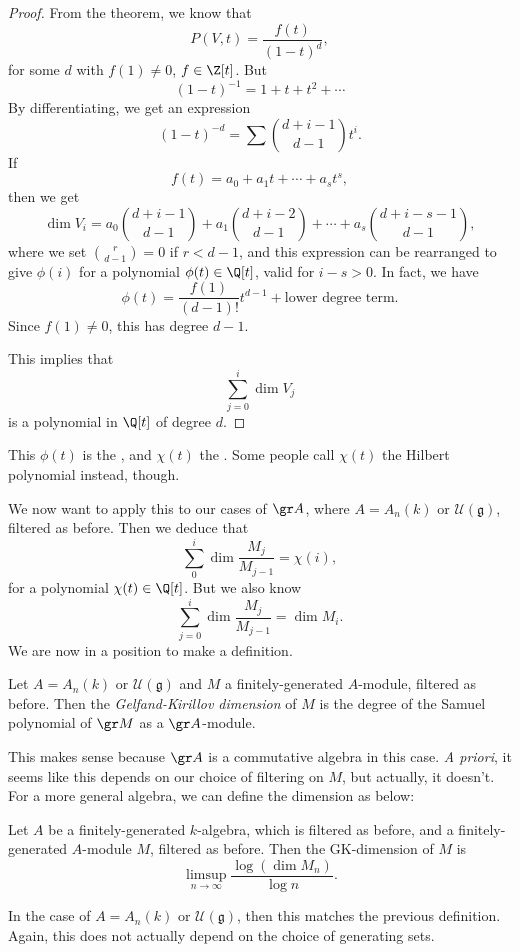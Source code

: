 \documentclass[a4paper]{article}
\newcommand\GKdim{\mathrm{GK}\mdash\mathrm{dim}}
\begin{document}
\begin{proof}
  From the theorem, we know that
  \[
    P(V, t) = \frac{f(t)}{(1 - t)^d},
  \]
  for some $d$ with $f(1) \not= 0$, $f \in \Z[t]$. But
  \[
    (1 - t)^{-1} = 1 + t + t^2 + \cdots
  \]
  By differentiating, we get an expression
  \[
    (1 - t)^{-d} = \sum \binom{d + i - 1}{d - 1} t^i.
  \]
  If
  \[
    f(t) = a_0 + a_1 t + \cdots + a_s t^s,
  \]
  then we get
  \[
    \dim V_i = a_0 \binom{d + i - 1}{d - 1} + a_1 \binom{d + i - 2}{d - 1} + \cdots + a_s \binom{d + i - s- 1}{d - 1},
  \]
  where we set $\binom{r}{d - 1} = 0$ if $r < d - 1$, and this expression can be rearranged to give $\phi(i)$ for a polynomial $\phi(t) \in \Q[t]$, valid for $i - s > 0$. In fact, we have
  \[
    \phi(t) = \frac{f(1)}{(d - 1)!} t^{d - 1} + \text{lower degree term}.
  \]
  Since $f(1) \not= 0$, this has degree $d - 1$.

  This implies that
  \[
    \sum_{j = 0}^i \dim V_j
  \]
  is a polynomial in $\Q[t]$ of degree $d$.
\end{proof}
This $\phi(t)$ is the , and $\chi(t)$ the . Some people call $\chi(t)$ the Hilbert polynomial instead, though.

We now want to apply this to our cases of $\gr A$, where $A = A_n(k)$ or $\mathcal{U}(\mathfrak{g})$, filtered as before. Then we deduce that
\[
  \sum_0^i \dim \frac{M_j}{M_{j - 1}} = \chi(i),
\]
for a polynomial $\chi(t) \in \Q[t]$. But we also know
\[
  \sum_{j = 0}^i \dim \frac{M_j}{M_{j - 1}} = \dim M_i.
\]
We are now in a position to make a definition.
\begin{defi}\index{$\GKdim(M)$}
  Let $A = A_n(k)$ or $\mathcal{U}(\mathfrak{g})$ and $M$ a finitely-generated $A$-module, filtered as before. Then the \emph{Gelfand-Kirillov dimension} of $M$ is the degree of the Samuel polynomial of $\gr M$ as a $\gr A$-module.
\end{defi}
This makes sense because $\gr A$ is a commutative algebra in this case. \emph{A priori}, it seems like this depends on our choice of filtering on $M$, but actually, it doesn't. For a more general algebra, we can define the dimension as below:

\begin{defi}\index{$\GKdim(M)$}
  Let $A$ be a finitely-generated $k$-algebra, which is filtered as before, and a finitely-generated $A$-module $M$, filtered as before. Then the GK-dimension of $M$ is
  \[
    \limsup_{n \to \infty} \frac{\log (\dim M_n)}{\log n}.
  \]
\end{defi}
In the case of $A = A_n(k)$ or $\mathcal{U}(\mathfrak{g})$, then this matches the previous definition. Again, this does not actually depend on the choice of generating sets.
\end{document}
